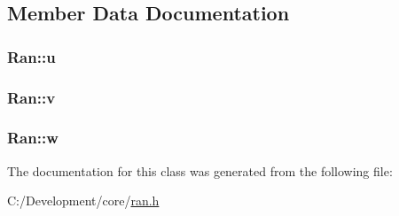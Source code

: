 \subsection{Member Data Documentation}
\hypertarget{class_ran_a507ebf8ba1237d08ec250f1f76814a12}{
\subsubsection[{u}]{ Ran\-::u\hspace{0.3cm}{\ttfamily [private]}}}\label{class_ran_a507ebf8ba1237d08ec250f1f76814a12}
\hypertarget{class_ran_ab8bc6c98270ea4cadc5d81304de429c3}{
\subsubsection[{v}]{ Ran\-::v\hspace{0.3cm}{\ttfamily [private]}}}\label{class_ran_ab8bc6c98270ea4cadc5d81304de429c3}
\hypertarget{class_ran_a55ac95f0eca7d8f7a9cf4c60ed109af7}{
\subsubsection[{w}]{ Ran\-::w\hspace{0.3cm}{\ttfamily [private]}}}\label{class_ran_a55ac95f0eca7d8f7a9cf4c60ed109af7}


The documentation for this class was generated from the following file\-:\begin{DoxyCompactItemize}
\item 
C\-:/\-Development/core/\hyperlink{ran_8h}{ran.\-h}\end{DoxyCompactItemize}
